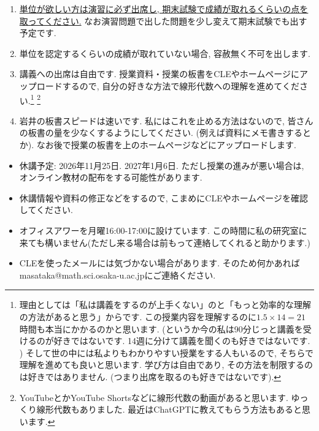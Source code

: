 \documentclass[dvipdfmx,a4paper,11pt]{article} %
\theoremstyle{definition}
\begin{document}
\medskip
{}
\begin{enumerate}
  \setlength{\parskip}{0cm} 
  \setlength{\itemsep}{0cm} 
\item \underline{単位が欲しい方は演習に必ず出席し, 期末試験で成績が取れるくらいの点を取ってください.} なお演習問題で出した問題を少し変えて期末試験でも出す予定です. 
\item 単位を認定するくらいの成績が取れていない場合, 容赦無く不可を出します. 
\item 講義への出席は自由です. 授業資料・授業の板書をCLEやホームページにアップロードするので, 自分の好きな方法で線形代数への理解を進めてください.\footnote{理由としては「私は講義をするのが上手くない」のと「もっと効率的な理解の方法があると思う」からです. この授業内容を理解するのに$1.5 \times 14 = 21$時間も本当にかかるのかと思います. (というか今の私は90分じっと講義を受けるのが好きではないです.  14週に分けて講義を聞くのも好きではないです. ) そして世の中には私よりもわかりやすい授業をする人もいるので, そちらで理解を進めても良いと思います. 学び方は自由であり, その方法を制限するのは好きではありません. (つまり出席を取るのも好きではないです). }
\footnote{YouTubeとかYouTube Shortsなどに線形代数の動画があると思います. ゆっくり線形代数もありました. 最近はChatGPTに教えてもらう方法もあると思います. }
\item 岩井の板書スピードは速いです. 私にはこれを止める方法はないので, 皆さんの板書の量を少なくするようにしてください. (例えば資料にメモ書きするとか). なお後で授業の板書を上のホームページなどにアップロードします.
\end{enumerate}


\vspace{11pt}
\begin{itemize}
  \setlength{\parskip}{0cm} %
  \setlength{\itemsep}{0cm} %
  \item 休講予定: 2026年11月25日. 2027年1月6日. ただし授業の進みが悪い場合は, オンライン教材の配布をする可能性があります. 
  \item 休講情報や資料の修正などをするので, こまめにCLEやホームページを確認してください.
   \item オフィスアワーを月曜16:00-17:00に設けています. この時間に私の研究室に来ても構いません(ただし来る場合は前もって連絡してくれると助かります.)
   \item CLEを使ったメールには気づかない場合があります. そのため何かあればmasataka@\allowbreak math.\allowbreak sci.\allowbreak osaka-u.\allowbreak ac.\allowbreak jpにご連絡ください. 
 \end{itemize}
\end{document}

